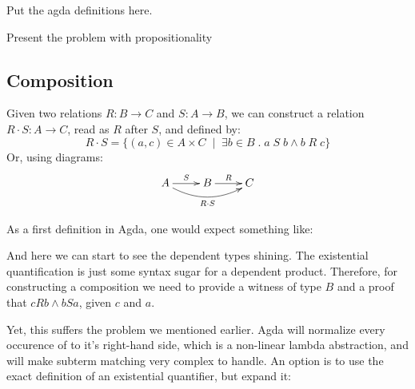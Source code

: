 \begin{TODO}
  \item Put the agda definitions here.
  \item Present the problem with propositionality
\end{TODO} 


\subsection{Composition}

Given two relations $R : B \rightarrow C$ and $S : A \rightarrow B$, we can construct a
relation $R \cdot S : A \rightarrow C$, read as $R$ after $S$, and defined by:
\[
  R \cdot S = \{ (a, c) \in A \times C\;\mid\; \exists b \in B\;.\; a\;S\;b \wedge b\;R\;c \}
\]
Or, using diagrams:
\begin{displaymath}
  \xymatrix{ A \ar[r]^S \ar@/_1pc/[rr]_{R \cdot S} & B \ar[r]^R & C }
\end{displaymath}

As a first definition in Agda, one would expect something like:


And here we can start to see the dependent types shining. The existential quantification
is just some syntax sugar for a dependent product. Therefore, for constructing a composition
we need to provide a witness of type $B$ and a proof that $c R b \wedge b S a$, given $c$ and $a$.

Yet, this suffers the problem we mentioned earlier. Agda will normalize every occurence of 
to it's right-hand side, which is a non-linear lambda abstraction, and will make subterm matching 
very complex to handle. An option is to use the exact definition of an existential quantifier,
but expand it:








